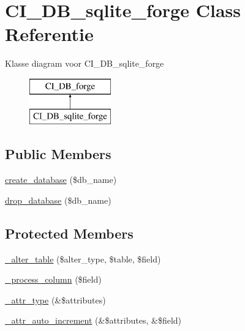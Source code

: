 \hypertarget{class_c_i___d_b__sqlite__forge}{}\section{C\+I\+\_\+\+D\+B\+\_\+sqlite\+\_\+forge Class Referentie}
\label{class_c_i___d_b__sqlite__forge}
Klasse diagram voor C\+I\+\_\+\+D\+B\+\_\+sqlite\+\_\+forge\begin{figure}[H]
\begin{center}
\leavevmode
\includegraphics[height=2.000000cm]{class_c_i___d_b__sqlite__forge}
\end{center}
\end{figure}
\subsection*{Public Members}
\begin{DoxyCompactItemize}
\item 
\mbox{\hyperlink{class_c_i___d_b__sqlite__forge_a902a7267babceb2ce595706f217e00ad}{create\+\_\+database}} (\$db\+\_\+name)
\item 
\mbox{\hyperlink{class_c_i___d_b__sqlite__forge_a9612987b2d4230de2638d15857e92e67}{drop\+\_\+database}} (\$db\+\_\+name)
\end{DoxyCompactItemize}
\subsection*{Protected Members}
\begin{DoxyCompactItemize}
\item 
\mbox{\hyperlink{class_c_i___d_b__sqlite__forge_a41c6cae02f2fda8b429ad0afb9509426}{\+\_\+alter\+\_\+table}} (\$alter\+\_\+type, \$table, \$field)
\item 
\mbox{\hyperlink{class_c_i___d_b__sqlite__forge_a8f38f1c5b5dddecca4befbe393f3f299}{\+\_\+process\+\_\+column}} (\$field)
\item 
\mbox{\hyperlink{class_c_i___d_b__sqlite__forge_a8553be952084c6f7cdfff370a1d14f6b}{\+\_\+attr\+\_\+type}} (\&\$attributes)
\item 
\mbox{\hyperlink{class_c_i___d_b__sqlite__forge_a2a013a5932439c3c44f0dad3436525f7}{\+\_\+attr\+\_\+auto\+\_\+increment}} (\&\$attributes, \&\$field)
\end{DoxyCompactItemize}

